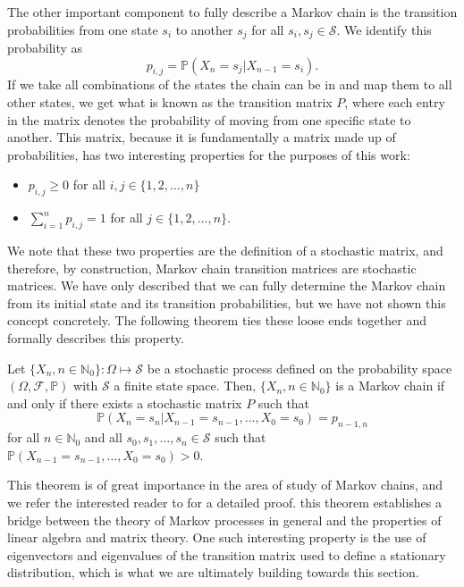 The other important component to fully describe a Markov chain is the transition probabilities from one state $s_i$ to another $s_j$ for all $s_i, s_j \in \mathcal{S}$. We identify this probability as 
\[ p_{i,j} = \mathbb{P}(X_{n} = s_j | X_{n-1} = s_i). \]
If we take all combinations of the states the chain can be in and map them to all other states, we get what is known as the transition matrix $P$, where each entry in the matrix denotes the probability of moving from one specific state to another. This matrix, because it is fundamentally a matrix made up of probabilities, has two interesting properties for the purposes of this work: 
\begin{itemize}
	\item $p_{i,j} \geq 0$ for all $i,j \in \{ 1, 2, \ldots, n \}$
	\item $\sum_{i=1}^{n} p_{i,j} = 1$ for all $j \in \{ 1, 2, \ldots, n \}$.  
\end{itemize}
We note that these two properties are the definition of a stochastic matrix, and therefore, by construction, Markov chain transition matrices are stochastic matrices. We have only described that we can fully determine the Markov chain from its initial state and its transition probabilities, but we have not shown this concept concretely. The following theorem ties these loose ends together and formally describes this property.

\begin{theorem}
	Let $\{ X_n, n \in \mathbb{N}_0 \}: \Omega \mapsto \mathcal{S}$ be a stochastic process defined on the probability space $(\Omega, \mathcal{F}, \mathbb{P})$ with $\mathcal{S}$ a finite state space. Then, $\{ X_n, n \in \mathbb{N}_0 \}$ is a Markov chain if and only if there exists a stochastic matrix $P$ such that 
	\[ \mathbb{P}(X_n = s_n | X_{n-1} = s_{n-1}, \ldots , X_0 = s_0) = p_{n-1, n} \]
	for all $n \in \mathbb{N}_0$ and all $s_0, s_1, \ldots , s_n \in \mathcal{S}$ such that $\mathbb{P}(X_{n-1} = s_{n-1}, \ldots , X_0 = s_0) > 0$. 
\end{theorem}

This theorem is of great importance in the area of study of Markov chains, and we refer the interested reader to \cite[\S 1.2]{chung_markov_1960} for a detailed proof. this theorem establishes a bridge between the theory of Markov processes in general and the properties of linear algebra and matrix theory. One such interesting property is the use of eigenvectors and eigenvalues of the transition matrix used to define a stationary distribution, which is what we are ultimately building towards this section. 

